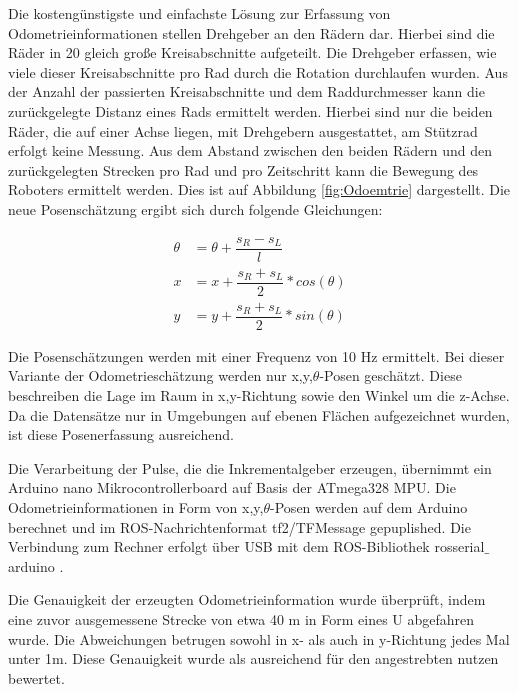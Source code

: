 Die kostengünstigste und einfachste Lösung zur Erfassung von Odometrieinformationen stellen Drehgeber an den Rädern dar. Hierbei sind die Räder in 20 gleich große Kreisabschnitte aufgeteilt. Die Drehgeber erfassen, wie viele dieser Kreisabschnitte pro Rad durch die Rotation durchlaufen wurden. Aus der Anzahl der passierten Kreisabschnitte und dem Raddurchmesser kann die zurückgelegte Distanz eines Rads ermittelt werden. Hierbei sind nur die beiden Räder, die auf einer Achse liegen, mit Drehgebern ausgestattet, am Stützrad erfolgt keine Messung. Aus dem Abstand zwischen den beiden Rädern und den zurückgelegten Strecken pro Rad und pro Zeitschritt kann die Bewegung des Roboters ermittelt werden. Dies ist auf Abbildung \ref{fig:Odoemtrie} dargestellt. Die neue Posenschätzung ergibt sich durch folgende Gleichungen: 

\begin{subequations}
	\begin{align}
		\theta &= \theta + \dfrac{s_R-s_L}{l} \\
		x &= x + \dfrac{s_R+s_L}{2}*cos(\theta) \\
		y &= y + \dfrac{s_R+s_L}{2}*sin(\theta)
	\end{align}
\end{subequations}

Die Posenschätzungen werden mit einer Frequenz von 10 Hz ermittelt. Bei dieser Variante der Odometrieschätzung werden nur x,y,$\theta$-Posen geschätzt. Diese beschreiben die Lage im Raum in x,y-Richtung sowie den Winkel um die z-Achse. Da die Datensätze nur in Umgebungen auf ebenen Flächen aufgezeichnet wurden, ist diese Posenerfassung ausreichend.

Die Verarbeitung der Pulse, die die Inkrementalgeber erzeugen, übernimmt ein Arduino nano Mikrocontrollerboard auf Basis der ATmega328 MPU. Die Odometrieinformationen in Form von x,y,$\theta$-Posen werden auf dem Arduino berechnet und im ROS-Nachrichtenformat tf2/TFMessage gepuplished. Die Verbindung zum Rechner erfolgt über USB mit dem ROS-Bibliothek rosserial$\_$arduino \cite{rosserial2018}. 

Die Genauigkeit der erzeugten Odometrieinformation wurde überprüft, indem eine zuvor ausgemessene Strecke von etwa 40 m in Form eines U abgefahren wurde. Die Abweichungen betrugen sowohl in x- als auch in y-Richtung jedes Mal unter 1m. Diese Genauigkeit wurde als ausreichend für den angestrebten nutzen bewertet.


